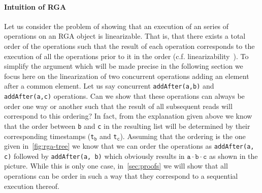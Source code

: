\paragraph{Intuition of RGA \CRDTLinshort{}}
Let us consider the problem of showing that an execution of an series
of operations on an RGA object is linearizable.
%
That is, that there exists a total order of the operations such that
the result of each operation corresponds to the execution of all the
operations prior to it in the order (c.f.
linearizability~\cite{HerlihyW90}).
%
To simplify the argument which will be made precise in the following
section we focus here on the linearization of two concurrent
operations adding an element after a common element. 
%
Let us say concurrent \lstinline|addAfter(a,b)| and
\lstinline|addAfter(a,c)| operations. 
% 
Can we show that these operations can always be order one way or
another such that the result of all subsequent reads will correspond
to this ordering?
%
In fact, from the explanation given above we know that the order
between \lstinline|b| and \lstinline|c| in the resulting list will be
determined by their corresponding timestamps
(\lstinline|t|$_{\mathtt{b}}$ and \lstinline|t|$_{\mathtt{c}}$). 
%
Assuming that the ordering is the one given in~\autoref{fig:rga-tree}
we know that we can order the operations as \lstinline|addAfter(a, c)|
followed by \lstinline|addAfter(a, b)| which obviously results in
$\mathtt{a \cdot b \cdot c}$ as shown in the picture. 
%
While this is only one case, in~\autoref{sec:proofs} we will show that
all operations can be order in such a way that they correspond to a
sequential execution thereof. 



